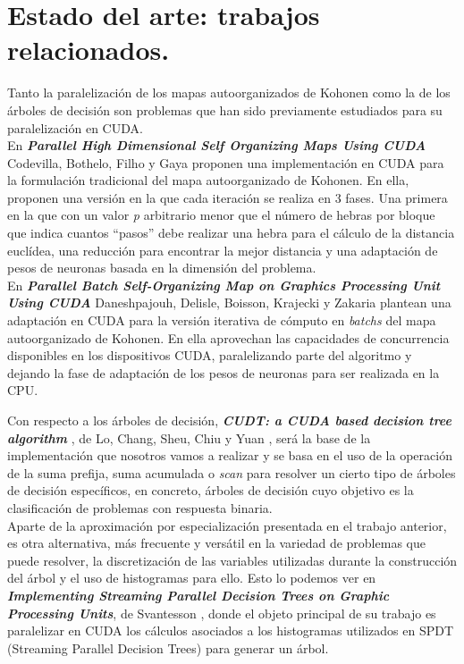 \documentclass[a4paper,11pt]{book}
\begin{document}
\section{Estado del arte: trabajos relacionados.}
Tanto la paralelización de los mapas autoorganizados de Kohonen como la de los árboles de decisión son problemas que han sido previamente estudiados para su paralelización en CUDA.\\

En \textbf{\textit{Parallel High Dimensional Self Organizing Maps Using CUDA}}  Codevilla, Bothelo, Filho y Gaya \cite{cudasomonline} proponen una implementación en CUDA para la formulación tradicional del mapa autoorganizado de Kohonen. En ella, proponen una versión en la que cada iteración se realiza en 3 fases. Una primera en la que con un valor \textit{p} arbitrario menor que el número de hebras por bloque que indica cuantos ``pasos'' debe realizar una hebra para el cálculo de la distancia euclídea, una reducción para encontrar la mejor distancia y una adaptación de pesos de neuronas basada en la dimensión del problema. \\

En \textbf{\textit{Parallel Batch Self-Organizing Map on Graphics Processing Unit Using CUDA}}  Daneshpajouh, Delisle, Boisson, Krajecki y Zakaria \cite{cudasombatch} plantean una adaptación en CUDA para la versión iterativa de cómputo en \textit{batchs} del mapa autoorganizado de Kohonen. En ella aprovechan las capacidades de concurrencia disponibles en los dispositivos CUDA, paralelizando parte del algoritmo y dejando la fase de adaptación de los pesos de neuronas para ser realizada en la CPU.

Con respecto a los árboles de decisión, \textbf{\textit{CUDT: a CUDA based decision tree algorithm}} , de Lo, Chang, Sheu, Chiu y Yuan \cite{cudt}, será la base de la implementación que nosotros vamos a realizar y se basa en el uso de la operación de la suma prefija, suma acumulada o \textit{scan} para resolver un cierto tipo de árboles de decisión específicos, en concreto, árboles de decisión cuyo objetivo es la clasificación de problemas con respuesta binaria.\\

Aparte de la aproximación por especialización presentada en el trabajo anterior, es otra alternativa, más frecuente y versátil en la variedad de problemas que puede resolver, la discretización de las variables utilizadas durante la construcción del árbol y el uso de histogramas para ello. Esto lo podemos ver en \textbf{\textit{Implementing Streaming Parallel Decision Trees on Graphic Processing Units}}, de Svantesson \cite{svatensson}, donde el objeto principal de su trabajo es paralelizar en CUDA los cálculos asociados a los histogramas utilizados en SPDT (Streaming Parallel Decision Trees) para generar un árbol.
\end{document}
